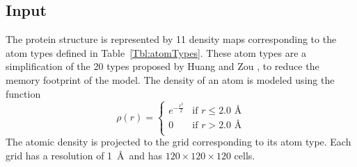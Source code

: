 \documentclass{bioinfo}
\begin{document}
\subsection{Input}
The protein structure is represented by 11 density maps corresponding
to the atom types defined in Table~\ref{Tbl:atomTypes}. These atom
types are a simplification of the 20 types proposed by Huang and
Zou \citep{huang2006iterative, huang2008iterative}, to reduce the
memory footprint of the model.
The density of an atom is modeled using the function
\begin{equation}
\label{eq:rho}
\rho(r) =  \begin{cases}
               e^{-\frac{r^2}{2}}&\text{if } r\leq 2.0\text{ \AA} \\
               0                 &\text{if } r>2.0\text{ \AA} \\
            \end{cases}
\end{equation}
The atomic density is projected to the grid corresponding to its atom
type. Each grid has a resolution of 1~\AA\ and has $120\times
120\times 120$ cells.
\end{document}
